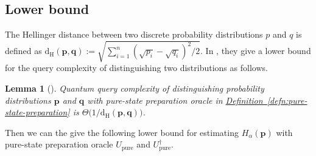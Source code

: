 \documentclass[journal]{IEEEtran}
\newtheorem{lemma}{Lemma}
\newcommand{\defn}[1]{\hyperref[defn:#1]{Definition~\ref*{defn:#1}}}
\begin{document}
\subsection{Lower bound}\label{sec:small-alpha-lower}
\noindent
The Hellinger distance between two discrete probability distributions $p$ and $q$ is defined as 
$\mathrm{d_{H}}(\mathbf{p},\mathbf{q}):=\sqrt{\sum_{i=1}^{n}(\sqrt{p_{i}}-\sqrt{q_{i}})^{2}/2}.
$
In \cite{belovs2019quantum}, they give a lower bound for the query complexity of distinguishing two distributions as follows. 
\begin{lemma}[{\cite[Claim 5]{belovs2019quantum}}]\label{lem:Hellinger}
Quantum query complexity of distinguishing probability distributions $\mathbf{p}$ and $\mathbf{q}$ with pure-state preparation oracle in \defn{pure-state-preparation} is $\Theta\bigl(1/\mathrm{d_H}(\mathbf{p},\mathbf{q})\bigr)$.
\end{lemma}
Then we can the give the following lower bound for estimating $H_{\alpha}(\mathbf{p})$ with pure-state preparation oracle $U_{\mathrm{pure}}$ and $U_{\mathrm{pure}}^{\dagger}$. 
\end{document}
